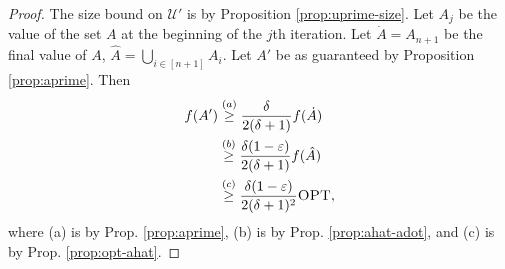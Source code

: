 \documentclass{article}
\theoremstyle{definition}
\newcommand{\uni}{\mathcal{U}}
\newcommand{\epsi}{\varepsilon}
\newcommand{\opt}{\textsc{OPT}}
\begin{document}
\begin{proof}
  The size bound on $\uni'$ is by Proposition \ref{prop:uprime-size}.
  Let $A_j$ be the value of the set
  $A$ at the beginning of the $j$th iteration. 
  Let $\dot A = A_{n+1}$ be the final value of $A$,
  $\hat A = \bigcup_{i \in [n + 1]} A_i$.
  Let $A'$ be as guaranteed by Proposition \ref{prop:aprime}.
  Then
  \begin{align*}
    f(A') &\overset{(a)}{\ge} \frac{\delta}{2(\delta + 1)} f( \dot A ) \\
          &\overset{(b)}{\ge} \frac{\delta (1 - \epsi)}{2(\delta + 1)} f( \hat A ) \\
          &\overset{(c)}{\ge} \frac{\delta (1 - \epsi)}{2(\delta + 1)^2} \opt,
  \end{align*}
  where (a) is by Prop. \ref{prop:aprime},
  (b) is by Prop. \ref{prop:ahat-adot},
  and (c) is by Prop. \ref{prop:opt-ahat}.
\end{proof}
\end{document}

